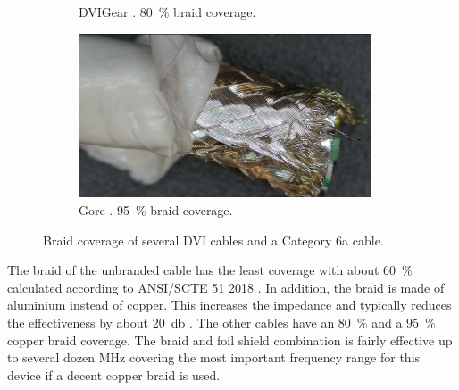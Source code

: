 \begin{figure}[ht]
\begin{subfigure}[t]{0.45\linewidth}
        \caption{DVIGear . \qty{80}{\percent} braid coverage.}
        \label{fig:braid_coverage_dvigear}
    \end{subfigure}
    \begin{subfigure}{0.45\linewidth}
        \centering
        \includegraphics[width=0.95\textwidth]{images/braid_coverage/14-57-9.jpg}
        \caption{Gore . \qty{95}{\percent} braid coverage.}
        \label{fig:braid_coverage_gore}
    \end{subfigure}
    \caption{Braid coverage of several DVI cables and a Category 6a cable.}
    \label{fig:braid_coverage}
\end{figure}

The braid of the unbranded cable has the least coverage with about \qty{60}{\percent} calculated according to ANSI/SCTE 51 2018 \cite{ANSI_SCTE_51_2018}. In addition, the braid is made of aluminium instead of copper. This increases the impedance and typically reduces the effectiveness by about \qty{20}{\decibel} \cite{circuit_designers_companion}. The other cables have an \qty{80}{\percent} and a \qty{95}{\percent} copper braid coverage. The braid and foil shield combination is fairly effective up to several dozen \unit{MHz} \citep[p. 84]{ott_electromagnetic} covering the most important frequency range for this device if a decent copper braid is used.

